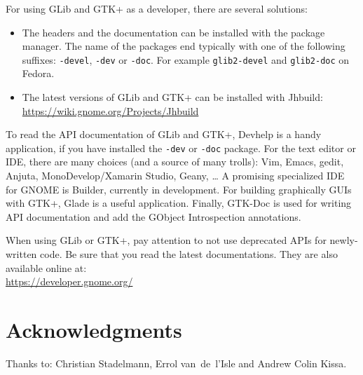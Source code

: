 For using GLib and GTK+ as a developer, there are several solutions:
\begin{itemize}
  \item The headers and the documentation can be installed with the package manager. The name of the packages end typically with one of the following suffixes: \texttt{-devel}, \texttt{-dev} or \texttt{-doc}. For example \texttt{glib2-devel} and \texttt{glib2-doc} on Fedora.
  \item The latest versions of GLib and GTK+ can be installed with Jhbuild:\\
  \url{https://wiki.gnome.org/Projects/Jhbuild}
\end{itemize}

To read the API documentation of GLib and GTK+, Devhelp is a handy application, if you have installed the \texttt{-dev} or \texttt{-doc} package. For the text editor or IDE, there are many choices (and a source of many trolls): Vim, Emacs, gedit, Anjuta, MonoDevelop/Xamarin Studio, Geany, … A promising specialized IDE for GNOME is Builder, currently in development. For building graphically GUIs with GTK+, Glade is a useful application. Finally, GTK-Doc is used for writing API documentation and add the GObject Introspection annotations.

When using GLib or GTK+, pay attention to not use deprecated APIs for newly-written code. Be sure that you read the latest documentations. They are also available online at:\\
\url{https://developer.gnome.org/}

\section{Acknowledgments}

Thanks to: Christian Stadelmann, Errol van~de~l'Isle and Andrew Colin Kissa.
